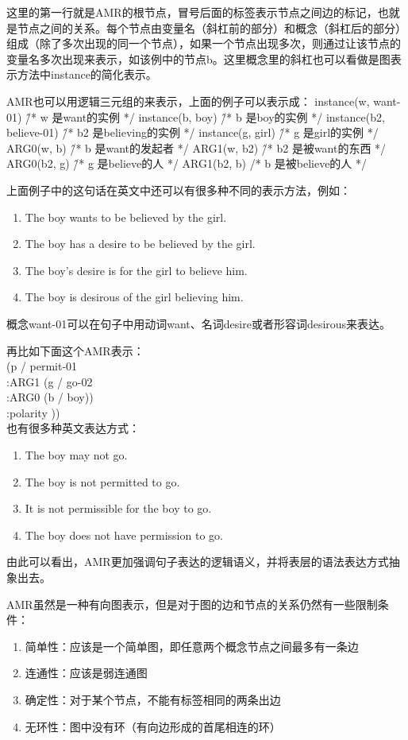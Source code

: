 \documentclass[master, winfont]{njuthesis}
\begin{document}
这里的第一行就是AMR的根节点，冒号后面的标签表示节点之间边的标记，也就是节点之间的关系。每个节点由变量名（斜杠前的部分）和概念（斜杠后的部分）组成（除了多次出现的同一个节点），如果一个节点出现多次，则通过让该节点的变量名多次出现来表示，如该例中的节点b。这里概念里的斜杠也可以看做是图表示方法中instance的简化表示。

AMR也可以用逻辑三元组的来表示，上面的例子可以表示成：
instance(w, want-01) \^      /* w 是want的实例 */ 
instance(b, boy) \^          /* b 是boy的实例 */ 
instance(b2, believe-01) \^  /* b2 是believing的实例 */ 
instance(g, girl) \^         /* g 是girl的实例 */ 
ARG0(w, b) \^                /* b 是want的发起者 */ 
ARG1(w, b2) \^               /* b2 是被want的东西 */ 
ARG0(b2, g) \^               /* g 是believe的人 */ 
ARG1(b2, b)                 /* b 是被believe的人 */

上面例子中的这句话在英文中还可以有很多种不同的表示方法，例如：
\begin{enumerate}
  \item The boy wants to be believed by the girl.
  \item The boy has a desire to be believed by the girl.
  \item The boy’s desire is for the girl to believe him.
  \item The boy is desirous of the girl believing him.
\end{enumerate}

概念want-01可以在句子中用动词want、名词desire或者形容词desirous来表达。

再比如下面这个AMR表示：\\
(p / permit-01 \\
     :ARG1 (g / go-02\\
              :ARG0 (b / boy))\\
     :polarity ))\\

也有很多种英文表达方式：
\begin{enumerate}
  \item The boy may not go.
  \item The boy is not permitted to go.
  \item It is not permissible for the boy to go.
  \item The boy does not have permission to go.
\end{enumerate}

由此可以看出，AMR更加强调句子表达的逻辑语义，并将表层的语法表达方式抽象出去。

AMR虽然是一种有向图表示，但是对于图的边和节点的关系仍然有一些限制条件\cite{Flanigan2014}：
\begin{enumerate}
  \item 简单性：应该是一个简单图，即任意两个概念节点之间最多有一条边
  \item 连通性：应该是弱连通图
  \item 确定性：对于某个节点，不能有标签相同的两条出边
  \item 无环性：图中没有环（有向边形成的首尾相连的环）
\end{enumerate}
\end{document}
